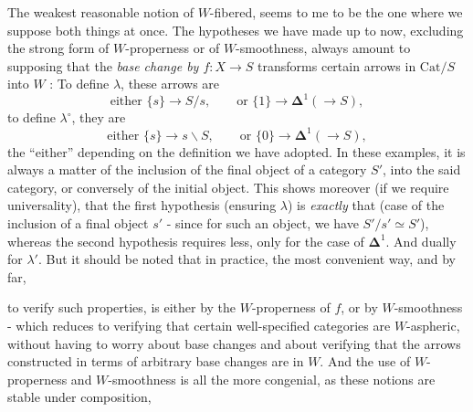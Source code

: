 \documentclass[11pt]{article}
\newcommand{\msp}[1]{\marginpar{\footnotesize [#1]}}
\newcommand{\Cat}{\mathrm{Cat}}
\begin{document}
\leavevmode\msp{page 37}The weakest reasonable notion of $W$-fibered, seems to me to be the one where we suppose both things at once. The hypotheses we have made up to now, excluding the strong form of $W$-properness or of $W$-smoothness, always amount to supposing that the \textit{base change by $f : X\longrightarrow S$} transforms certain arrows in $\Cat/S$ into $W$ : To define $\lambda$, these arrows are
\[
\text{either } \{s\}\longrightarrow S/s,\qquad \text{or } \{1\}\longrightarrow\mathbf{\Delta}^1(\longrightarrow S),
\]
to define $\lambda^\circ$, they are
\[
\text{either } \{s\}\longrightarrow s\backslash S,\qquad \text{or } \{0\}\longrightarrow\mathbf{\Delta}^1(\longrightarrow S),
\]
the ``either'' depending on the definition we have adopted. In these examples, it is always a matter of the inclusion of the final object of a category $S'$, into the said category, or conversely of the initial object. This shows moreover (if we require universality), that the first hypothesis (ensuring $\lambda$) is \textit{exactly} that (case of the inclusion of a final object $s'$ - since for such an object, we have $S'/s'\simeq S'$), whereas the second hypothesis requires less, only for the case of $\mathbf{\Delta}^1$. And dually for $\lambda'$. But it should be noted that in practice, the most convenient way, and by far,

\leavevmode\msp{page 38}to verify such properties, is either by the $W$-properness of $f$, or by $W$-smoothness - which reduces to verifying that certain well-specified categories are $W$-aspheric, without having to worry about base changes and about verifying that the arrows constructed in terms of arbitrary base changes are in $W$. And the use of $W$-properness and $W$-smoothness is all the more congenial, as these notions are stable under composition,
\end{document}
